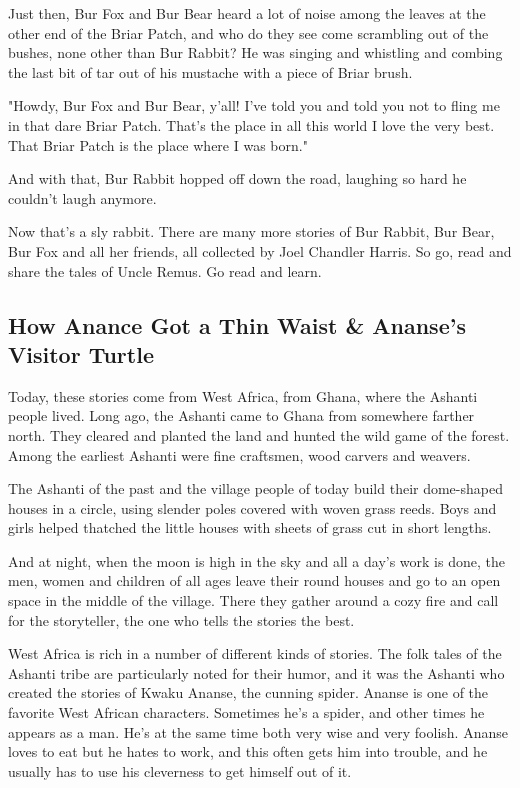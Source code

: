 Just then, Bur Fox and Bur Bear heard a lot of noise among the leaves at the other end of the Briar Patch, and who do they see come scrambling out of the bushes, none other than Bur Rabbit? He was singing and whistling and combing the last bit of tar out of his mustache with a piece of Briar brush.

"Howdy, Bur Fox and Bur Bear, y'all! I've told you and told you not to fling me in that dare Briar Patch. That's the place in all this world I love the very best. That Briar Patch is the place where I was born."

And with that, Bur Rabbit hopped off down the road, laughing so hard he couldn't laugh anymore.

Now that's a sly rabbit. There are many more stories of Bur Rabbit, Bur Bear, Bur Fox and all her friends, all collected by Joel Chandler Harris. So go, read and share the tales of Uncle Remus. Go read and learn.

\subsection{How Anance Got a Thin Waist \& Ananse's Visitor Turtle}

Today, these stories come from West Africa, from Ghana, where the Ashanti people lived. Long ago, the Ashanti came to Ghana from somewhere farther north. They cleared and planted the land and hunted the wild game of the forest. Among the earliest Ashanti were fine craftsmen, wood carvers and weavers.

The Ashanti of the past and the village people of today build their dome-shaped houses in a circle, using slender poles covered with woven grass reeds. Boys and girls helped thatched the little houses with sheets of grass cut in short lengths.

And at night, when the moon is high in the sky and all a day's work is done, the men, women and children of all ages leave their round houses and go to an open space in the middle of the village. There they gather around a cozy fire and call for the storyteller, the one who tells the stories the best.

West Africa is rich in a number of different kinds of stories. The folk tales of the Ashanti tribe are particularly noted for their humor, and it was the Ashanti who created the stories of Kwaku Ananse, the cunning spider. Ananse is one of the favorite West African characters. Sometimes he's a spider, and other times he appears as a man. He's at the same time both very wise and very foolish. Ananse loves to eat but he hates to work, and this often gets him into trouble, and he usually has to use his cleverness to get himself out of it.

